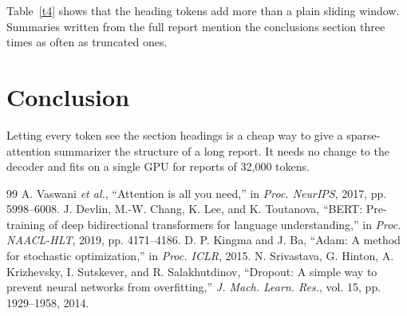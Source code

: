 \documentclass[conference]{IEEEtran}
\begin{document}
Table~\ref{t4} shows that the heading tokens add more than a plain sliding window. Summaries written from the full report
mention the conclusions section three times as often as truncated ones.

\section{Conclusion}
Letting every token see the section headings is a cheap way to give a sparse-attention summarizer the structure of a long
report. It needs no change to the decoder and fits on a single GPU for reports of 32,000 tokens.

\begin{thebibliography}{99}
 A. Vaswani \emph{et al.}, ``Attention is all you need,'' in \emph{Proc. NeurIPS}, 2017, pp. 5998--6008.
 J. Devlin, M.-W. Chang, K. Lee, and K. Toutanova, ``BERT: Pre-training of deep bidirectional transformers for language understanding,'' in \emph{Proc. NAACL-HLT}, 2019, pp. 4171--4186.
 D. P. Kingma and J. Ba, ``Adam: A method for stochastic optimization,'' in \emph{Proc. ICLR}, 2015.
 N. Srivastava, G. Hinton, A. Krizhevsky, I. Sutskever, and R. Salakhutdinov, ``Dropout: A simple way to prevent neural networks from overfitting,'' \emph{J. Mach. Learn. Res.}, vol. 15, pp. 1929--1958, 2014.
\end{thebibliography}
\end{document}

